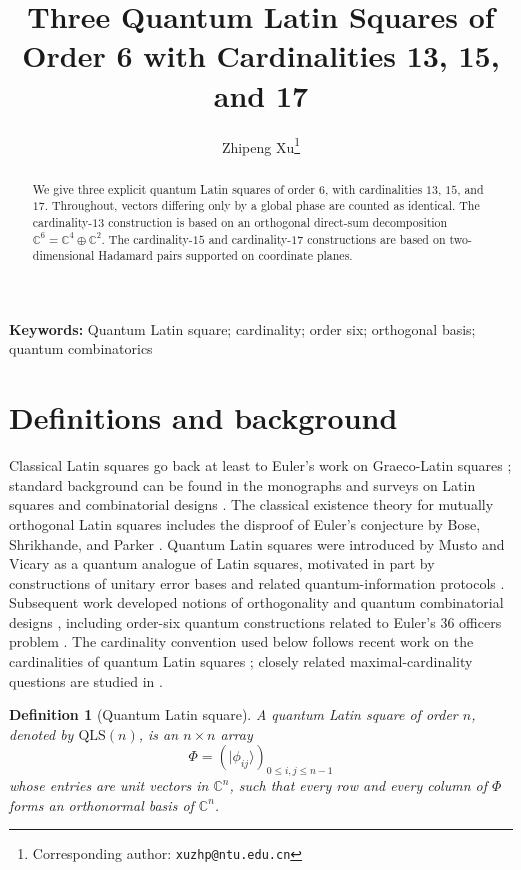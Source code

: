 \documentclass[a4paper,11pt]{article}
\title{Three Quantum Latin Squares of Order 6 with Cardinalities 13, 15, and 17}
\author[1]{Zhipeng Xu\thanks{Corresponding author: \texttt{xuzhp@ntu.edu.cn}}}
\affil[1]{School of Mathematics and Statistics, Nantong University, Nantong, China}
\newcommand{\C}{\mathbb{C}}
\newcommand{\ket}[1]{\lvert #1\rangle}
\newcommand{\QLS}{\mathrm{QLS}}
\newtheorem{definition}{Definition}
\begin{document}
\maketitle

\begin{abstract}
We give three explicit quantum Latin squares of order $6$, with cardinalities
$13$, $15$, and $17$. Throughout, vectors differing only by a global phase are
counted as identical. The cardinality-$13$ construction is based on an
orthogonal direct-sum decomposition $\C^6=\C^4\oplus\C^2$. The cardinality-$15$
and cardinality-$17$ constructions are based on two-dimensional Hadamard pairs
supported on coordinate planes.
\end{abstract}
\noindent\textbf{Keywords:}
Quantum Latin square; cardinality; order six; orthogonal basis; quantum combinatorics
\section{Definitions and background}

Classical Latin squares go back at least to Euler's work on Graeco-Latin
squares \cite{Euler1782}; standard background can be found in the monographs and
surveys on Latin squares and combinatorial designs
\cite{DenesKeedwell1974,ColbournDinitz2007}. The classical existence theory for
mutually orthogonal Latin squares includes the disproof of Euler's conjecture by
Bose, Shrikhande, and Parker \cite{BoseShrikhandeParker1960}. Quantum Latin
squares were introduced by Musto and Vicary \cite{MustoVicary2016} as a quantum
analogue of Latin squares, motivated in part by constructions of unitary error
bases and related quantum-information protocols \cite{Werner2001,TadejZyczkowski2006}.
Subsequent work developed notions of orthogonality and quantum combinatorial
designs \cite{GoyenecheRaissiMartinoZyczkowski2018,MustoVicary2019}, including
order-six quantum constructions related to Euler's 36 officers problem
\cite{RatherBurchardtBruzdaRajchelLakshminarayanZyczkowski2022,ZyczkowskiBruzdaRajchelEtAl2023}.
The cardinality convention used below follows recent work on the cardinalities
of quantum Latin squares \cite{ZhangWangJi2025,ZangZhengTianShan2025,ZhangJi2026};
closely related maximal-cardinality questions are studied in \cite{ZhangCao2026}.

\begin{definition}[Quantum Latin square]
A quantum Latin square of order $n$, denoted by $\QLS(n)$, is an $n\times n$
array
\[
  \Phi=(\ket{\phi_{ij}})_{0\leq i,j\leq n-1}
\]
whose entries are unit vectors in $\C^n$, such that every row and every column
of $\Phi$ forms an orthonormal basis of $\C^n$.
\end{definition}
\end{document}
